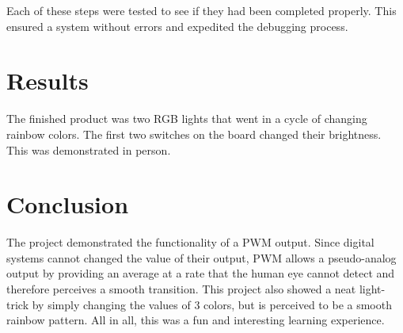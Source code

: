 \documentclass[11pt]{article}
\begin{document}
\quad Each of these steps were tested to see if they had been completed properly. This ensured a system without errors and expedited the debugging process.

\section{Results}
\quad The finished product was two RGB lights that went in a cycle of changing rainbow colors. The first two switches on the board changed their brightness. This was demonstrated in person. 
\section{Conclusion}
\quad The project demonstrated the functionality of a PWM output. Since digital systems cannot changed the value of their output, PWM allows a pseudo-analog output by providing an average at a rate that the human eye cannot detect and therefore perceives a smooth transition. This project also showed a neat light-trick by simply changing the values of 3 colors, but is perceived to be a smooth rainbow pattern. All in all, this was a fun and interesting learning experience. 
\end{document}
